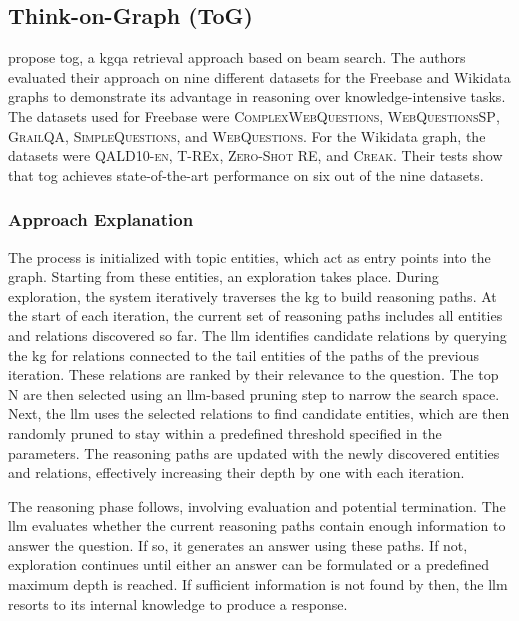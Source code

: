 \subsection{Think-on-Graph (ToG)}

\textcite{sun_think--graph_2024} propose \gls{tog}, a \gls{kgqa} retrieval approach based on beam search. The authors evaluated their approach on nine different datasets for the Freebase and Wikidata graphs to demonstrate its advantage in reasoning over knowledge-intensive tasks. The datasets used for Freebase were \textsc{ComplexWebQuestions}, \textsc{WebQuestionsSP}, \textsc{GrailQA}, \textsc{SimpleQuestions}, and \textsc{WebQuestions}. For the Wikidata graph, the datasets were \textsc{QALD10-en}, \textsc{T-REx}, \textsc{Zero-Shot RE}, and \textsc{Creak}. Their tests show that \gls{tog} achieves state-of-the-art performance on six out of the nine datasets.

\subsubsection{Approach Explanation} 
The process is initialized with topic entities, which act as entry points into the graph. Starting from these entities, an exploration takes place. During exploration, the system iteratively traverses the \gls{kg} to build reasoning paths. At the start of each iteration, the current set of reasoning paths includes all entities and relations discovered so far. The \gls{llm} identifies candidate relations by querying the \gls{kg} for relations connected to the tail entities of the paths of the previous iteration. These relations are ranked by their relevance to the question. The top N are then selected using an \gls{llm}-based pruning step to narrow the search space. Next, the \gls{llm} uses the selected relations to find candidate entities, which are then randomly pruned to stay within a predefined threshold specified in the parameters. The reasoning paths are updated with the newly discovered entities and relations, effectively increasing their depth by one with each iteration.

The reasoning phase follows, involving evaluation and potential termination. The \gls{llm} evaluates whether the current reasoning paths contain enough information to answer the question. If so, it generates an answer using these paths. If not, exploration continues until either an answer can be formulated or a predefined maximum depth is reached. If sufficient information is not found by then, the \gls{llm} resorts to its internal knowledge to produce a response.


